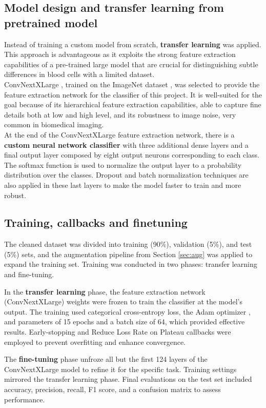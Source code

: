 \documentclass[10pt]{article}
\begin{document}
\begin{multicols}{2}
        \subsection{Model design and transfer learning from pretrained model}
        Instead of training a custom model from scratch, \textbf{transfer learning} was applied.
        This approach is advantageous as it exploits the strong feature extraction capabilities of a pre-trained large model that are crucial for distinguishing subtle differences in blood cells with a limited dataset.\\
        ConvNextXLarge \cite{liu2022convnext}, trained on the ImageNet dataset \cite{deng2009imagenet}, was selected to provide the feature extraction network for the classifier of this project. It is well-suited for the goal because of its hierarchical feature extraction capabilities, able to capture fine details both at low and high level, and its robustness to image noise, very common in biomedical imaging. \cite{keras_applications} \\
        At the end of the ConvNextXLarge feature extraction network, there is a \textbf{custom neural network classifier} with three additional dense layers and a final output layer composed by eight output neurons corresponding to each class. The softmax function is used to normalize the output layer to a probability distribution over the classes. Dropout and batch normalization techniques are also applied in these last layers to make the model faster to train and more robust. 
        \subsection{Training, callbacks and finetuning}
        The cleaned dataset was divided into training (90\%), validation (5\%), and test (5\%) sets, and the augmentation pipeline from Section \ref{sec:aug} was applied to expand the training set. Training was conducted in two phases: transfer learning and fine-tuning.

        In the \textbf{transfer learning} phase, the feature extraction network (ConvNextXLarge) weights were frozen to train the classifier at the model's output. The training used categorical cross-entropy loss, the Adam optimizer \cite{warner_optimizer}, and parameters of 15 epochs and a batch size of 64, which provided effective results. Early-stopping and Reduce Loss Rate on Plateau callbacks were employed to prevent overfitting and enhance convergence.

        The \textbf{fine-tuning} phase unfroze all but the first 124 layers of the ConvNextXLarge model to refine it for the specific task. Training settings mirrored the transfer learning phase. Final evaluations on the test set included accuracy, precision, recall, F1 score, and a confusion matrix to assess performance.
        

\end{multicols}
\end{document}
